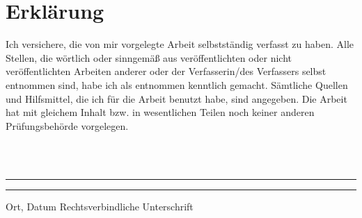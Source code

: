 \documentclass[twoside,11pt]{article}
\begin{document}


\newpage
\section*{Erklärung}
Ich versichere, die von mir vorgelegte Arbeit
selbstst\"andig verfasst zu haben.
Alle Stellen, die w\"ortlich oder sinngem\"a{\ss} aus
ver\"offentlichten oder nicht ver\"offentlichten Arbeiten
anderer oder der Verfasserin/des Verfassers selbst
entnommen sind, habe ich als entnommen kenntlich gemacht.
S\"amtliche Quellen und Hilfsmittel, die ich für die Arbeit
benutzt habe, sind angegeben.
Die Arbeit hat mit gleichem Inhalt bzw. in wesentlichen
Teilen noch keiner anderen Pr\"ufungsbeh\"orde vorgelegen.

~\\
~\\
\noindent
\rule{0.35\textwidth}{0.4pt}
\hspace*{3cm}
\rule{0.45\textwidth}{0.4pt}
\newline
Ort, Datum	\hspace*{6.3cm}	Rechtsverbindliche Unterschrift
\end{document}
